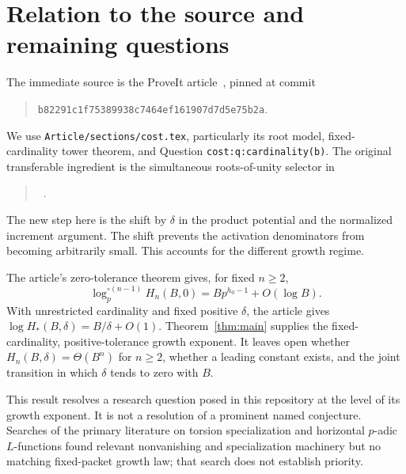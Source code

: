\documentclass[11pt]{article}
\theoremstyle{remark}\newtheorem{remark}[theorem]{Remark}
\begin{document}
\section{Relation to the source and remaining questions}
The immediate source is the ProveIt article~\cite{proveit-cost}, pinned at commit
\begin{quote}\small\texttt{b82291c1f75389938c7464ef161907d7d5e75b2a}.\end{quote}
We use \texttt{Article/sections/cost.tex}, particularly its root model, fixed-cardinality
tower theorem, and Question \texttt{cost:q:cardinality(b)}.
The original transferable ingredient is the simultaneous roots-of-unity selector in
\begin{quote}\small\raggedright
{}~\cite{grh-roots}.
\end{quote}
The new step here is the shift by $\delta$ in the product potential and the normalized
increment argument. The shift prevents the activation denominators from becoming
arbitrarily small. This accounts for the different growth regime.

The article's zero-tolerance theorem gives, for fixed $n\ge2$,
\[
 \log_p^{\circ(n-1)}H_n(B,0)
  =Bp^{h_0-1}+O(\log B).
\]
With unrestricted cardinality and fixed positive $\delta$, the article gives
$\log H_*(B,\delta)=B/\delta+O(1)$.
Theorem~\ref{thm:main} supplies the fixed-cardinality, positive-tolerance growth exponent.
It leaves open whether $H_n(B,\delta)=\Theta(B^n)$ for $n\ge2$, whether a leading constant
exists, and the joint transition in which $\delta$ tends to zero with $B$.

This result resolves a research question posed in this repository at the level of its
growth exponent. It is not a resolution of a prominent named conjecture. Searches of the
primary literature on torsion specialization and horizontal $p$-adic $L$-functions found
relevant nonvanishing and specialization machinery but no matching fixed-packet growth law;
that search does not establish priority.
\end{document}
